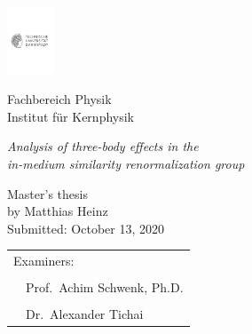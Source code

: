 \newlength{\titleheight}
\setlength{\titleheight}{100pt}
\begin{titlingpage}

\parbox{\textwidth}{
\includegraphics[height=20mm]{thesis/doc/tud_logo.pdf}
\\[.3cm]
\raggedright
{\hfill Fachbereich Physik \\
Institut f\"{u}r Kernphysik
}
}
\begin{center}

\vfill

{
    \centering
    \begingroup
    \setlength{\baselineskip}{1.cm}
    {\fontsize{13}{12}%
        {\LARGE\textit{{Analysis of three-body effects in the \\ in-medium similarity renormalization group}}}}\\ %
    \endgroup
}

\vfill

{

    \large{Master's thesis} \\
    \vspace{3mm}
    \large{by Matthias Heinz} \\
    \vspace{3mm}
    \large{Submitted: October 13, 2020} \\
}

\vfill

\newcommand{\smallsize}{5pt}
\newcommand{\bigsize}{25pt}

{
    \begin{tabular}{lll}
        \multicolumn{3}{l}{Examiners:}                 \\ \\
         &
        \multicolumn{2}{l}{Prof.~Achim Schwenk, Ph.D.} \\ \\
         &
        \multicolumn{2}{l}{Dr.~Alexander Tichai}
    \end{tabular}
    \vfill
}

\end{center}
\end{titlingpage}